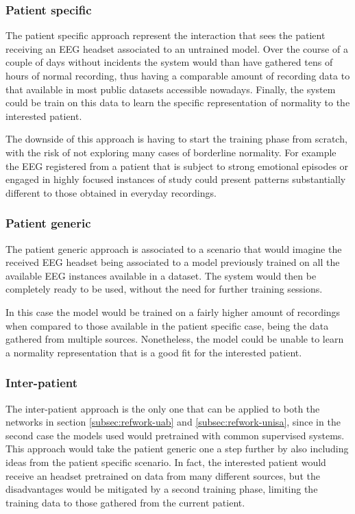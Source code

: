 \subsubsection{Patient specific}
The patient specific approach represent the interaction that sees the patient receiving an \gls{EEG} headset associated to an untrained model. Over the course of a couple of days without incidents the system would than have gathered tens of hours of normal recording, thus having a comparable amount of recording data to that available in most public datasets accessible nowadays. Finally, the system could be train on this data to learn the specific representation of normality to the interested patient.

The downside of this approach is having to start the training phase from scratch, with the risk of not exploring many cases of borderline normality. For example the \gls{EEG} registered from a patient that is subject to strong emotional episodes or engaged in highly focused instances of study could present patterns substantially different to those obtained in everyday recordings.

\subsubsection{Patient generic}
The patient generic approach is associated to a scenario that would imagine the received \gls{EEG} headset being associated to a model previously trained on all the available \gls{EEG} instances available in a dataset. The system would then be completely ready to be used, without the need for further training sessions.

In this case the model would be trained on a fairly higher amount of recordings when compared to those available in the patient specific case, being the data gathered from multiple sources. Nonetheless, the model could be unable to learn a normality representation that is a good fit for the interested patient.

\subsubsection{Inter-patient}
The inter-patient approach is the only one that can be applied to both the networks in section \ref{subsec:refwork-uab} and \ref{subsec:refwork-unisa}, since in the second case the models used would pretrained with common supervised systems. 
This approach would take the patient generic one a step further by also including ideas from the patient specific scenario. In fact, the interested patient would receive an headset pretrained on data from many different sources, but the disadvantages would be mitigated by a second training phase, limiting the training data to those gathered from the current patient.

